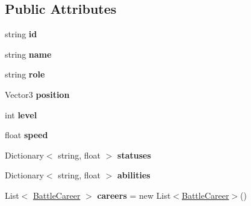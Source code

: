\subsection*{Public Attributes}
\begin{DoxyCompactItemize}
\item 
string {\bfseries id}\hypertarget{class_battle_character_aefcd8895f3b4314d8d9162177f7dc544}{}\label{class_battle_character_aefcd8895f3b4314d8d9162177f7dc544}

\item 
string {\bfseries name}\hypertarget{class_battle_character_adc7a29b174259b7ea842a1def5c368cd}{}\label{class_battle_character_adc7a29b174259b7ea842a1def5c368cd}

\item 
string {\bfseries role}\hypertarget{class_battle_character_a854569c8ef8d4300673db4f0915f453e}{}\label{class_battle_character_a854569c8ef8d4300673db4f0915f453e}

\item 
Vector3 {\bfseries position}\hypertarget{class_battle_character_a2657c45583a4eddf69b51a9af78158fe}{}\label{class_battle_character_a2657c45583a4eddf69b51a9af78158fe}

\item 
int {\bfseries level}\hypertarget{class_battle_character_aac9f8189b1745340cf72478e00431b55}{}\label{class_battle_character_aac9f8189b1745340cf72478e00431b55}

\item 
float {\bfseries speed}\hypertarget{class_battle_character_a08bd64c76e7fa1c43358a18fae0bc321}{}\label{class_battle_character_a08bd64c76e7fa1c43358a18fae0bc321}

\item 
Dictionary$<$ string, float $>$ {\bfseries statuses}\hypertarget{class_battle_character_ab89653fa7dd2c33ee8cd8c04427495c9}{}\label{class_battle_character_ab89653fa7dd2c33ee8cd8c04427495c9}

\item 
Dictionary$<$ string, float $>$ {\bfseries abilities}\hypertarget{class_battle_character_a66a754e6c3d0ad4f47954a328ef93d12}{}\label{class_battle_character_a66a754e6c3d0ad4f47954a328ef93d12}

\item 
List$<$ \hyperlink{class_battle_career}{Battle\+Career} $>$ {\bfseries careers} = new List$<$\hyperlink{class_battle_career}{Battle\+Career}$>$()\hypertarget{class_battle_character_a45d2b5a7a48d60401a62cbba17fa9da9}{}\label{class_battle_character_a45d2b5a7a48d60401a62cbba17fa9da9}


\end{DoxyCompactItemize}
